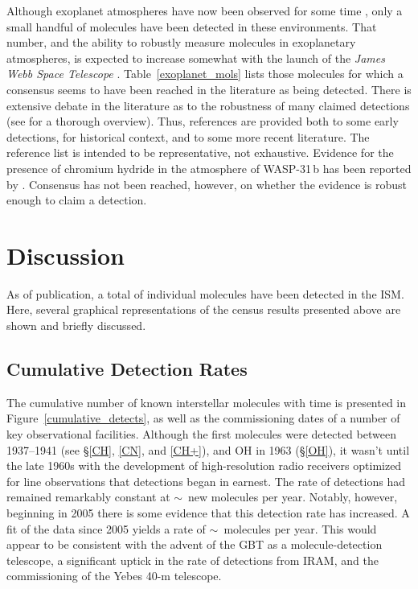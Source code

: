 \documentclass[twocolumn]{aastex631}
\newcommand{\update}[1]{{#1}}
\newcommand{\nmols}{}
\newcommand{\rateall}{}
\newcommand{\ratenew}{}
\begin{document}
Although exoplanet atmospheres have now been observed for some time \citep{Charbonneau:2002yw}, only a small handful of molecules have been detected in these environments. That number, and the ability to robustly measure molecules in exoplanetary atmospheres, is expected to increase somewhat with the launch of the \emph{James Webb Space Telescope} \citep{Schlawin:2018cq}.  Table~\ref{exoplanet_mols} lists those molecules for which a consensus seems to have been reached in the literature as being detected.  There is extensive debate in the literature as to the robustness of many claimed detections (see \citealt{Madhusudhan:2016dl} for a thorough overview).  Thus, references are provided both to some early detections, for historical context, and to some more recent literature.  The reference list is intended to be representative, not exhaustive.  \update{Evidence for the presence of chromium hydride  in the atmosphere of WASP-31\,b  has been reported by \citet{2021A&A...646A..17B}.  Consensus has not been reached, however, on whether the evidence is robust enough to claim a detection.}



\section{Discussion}
\label{discussion}

As of publication, a total of \update{\nmols} individual molecules have been detected in the ISM.  Here, several graphical representations of the census results presented above are shown and briefly discussed.  


\subsection{Cumulative Detection Rates}
\label{cumulative_rates}

The cumulative number of known interstellar molecules with time is presented in Figure~\ref{cumulative_detects}, as well as the commissioning dates of a number of key observational facilities.  Although the first molecules were detected between 1937--1941 (see \S\ref{CH}, \ref{CN}, and \ref{CH+}), and OH in 1963 (\S\ref{OH}), it wasn't until the late 1960s with the development of high-resolution radio receivers optimized for line observations that detections began in earnest.  \update{The rate of detections had remained remarkably constant at $\sim$\rateall~new molecules per year.  Notably, however, beginning in 2005 there is some evidence that this detection rate has increased.  A fit of the data since 2005 yields a rate of $\sim$\ratenew~molecules per year.  This would appear to be consistent with the advent of the GBT as a molecule-detection telescope, a significant uptick in the rate of detections from IRAM, and the commissioning of the Yebes 40-m telescope.}
\end{document}
